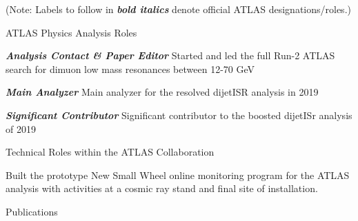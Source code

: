\hspace{0.45in}
\begin{minipage}{0.8\textwidth}

(Note: Labels to follow in \textbf{\textit{bold italics}} denote official ATLAS designations/roles.)
\vspace{0.15in}

ATLAS Physics Analysis Roles
\vspace{0.1in}

\hspace{0.2in}
\begin{minipage}{\textwidth}
\textbf{\textit{Analysis Contact \& Paper Editor}} Started and led the full Run-2 ATLAS search for dimuon low mass resonances between 12-70 GeV
\end{minipage}

\vspace{0.1in}
\hspace{0.2in}
\begin{minipage}{\textwidth}
\textbf{\textit{Main Analyzer}} Main analyzer for the resolved dijetISR analysis in 2019%
\end{minipage}


\vspace{0.1in}
\hspace{0.2in}
\begin{minipage}{\textwidth}
\textbf{\textit{Significant Contributor}} Significant contributor to the boosted dijetISr analysis of 2019%

\vspace{0.15in}
Technical Roles within the ATLAS Collaboration

\vspace{0.15in}
\hspace{0.2in}
\begin{minipage}{\textwidth}
    Built the prototype New Small Wheel online monitoring program for the ATLAS analysis with activities at a cosmic ray stand and final site of installation.
\end{minipage}





\newpage
\vspace{0.25in}
{\Large Publications}\\
\HRule


\end{minipage}
\end{minipage}
